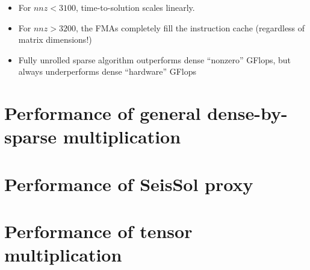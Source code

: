   \begin{itemize}
    \item For $nnz < 3100$, time-to-solution scales linearly.
    \item For $nnz > 3200$, the FMAs completely fill the instruction cache (regardless of matrix dimensions!)
    \item Fully unrolled sparse algorithm outperforms dense ``nonzero'' GFlops, but always underperforms dense ``hardware'' GFlops
    
  \end{itemize}


\section{Performance of general dense-by-sparse multiplication}

\section{Performance of SeisSol proxy}

\section{Performance of tensor multiplication}